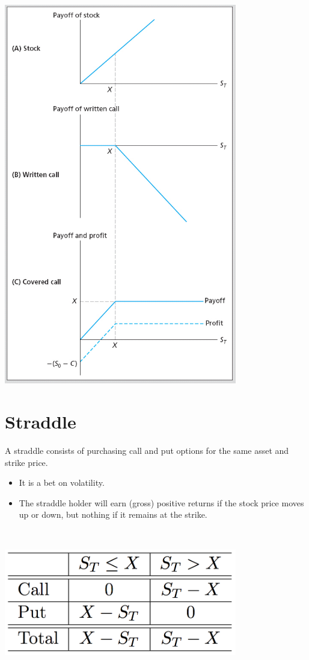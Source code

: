 \documentclass[letterpaper,10pt,english]{sphinxmanual}
\begin{document}
\includegraphics[width=4in]{bod34698_1508_lg.jpg}


\section{Straddle}
\label{options:straddle}
A straddle consists of purchasing call and put options for the same
asset and strike price.
\begin{itemize}
\item {} 
It is a bet on volatility.

\end{itemize}
\begin{itemize}
\item {} 
The straddle holder will earn (gross) positive returns if the stock
price moves up or down, but nothing if it remains at the strike.

\end{itemize}

$\qquad$

{\hfill\includegraphics[width=4in]{table5.png}\hfill}
\end{document}
